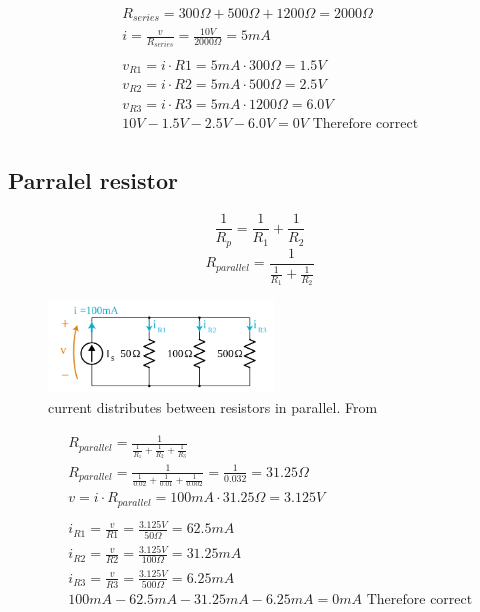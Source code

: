 \begin{align*}
  &\quad R_{series} = 300\Omega + 500\Omega + 1200\Omega = 2000\Omega \\
  &\quad i = \frac{v}{R_{series}} = \frac{10V}{2000\Omega} = 5mA \\
  &\quad \\
  &\quad v_{R1} = i\cdot R1 = 5mA\cdot 300\Omega = 1.5V \\
  &\quad v_{R2} = i\cdot R2 = 5mA\cdot 500\Omega = 2.5V \\
  &\quad v_{R3} = i\cdot R3 = 5mA\cdot 1200\Omega = 6.0V \\
  &\quad 10V -1.5V -2.5V -6.0V = 0V \text{ Therefore correct }\\
\end{align*}


\subsection{Parralel resistor}
\begin{equation} \frac{1}{R_p} = \frac{1}{R_1} + \frac{1}{R_2} \end{equation}
\begin{equation} R_{parallel} = \frac{1}{\frac{1}{R_1} + \frac{1}{R_2}} \end{equation}

\begin{figure}[h]
    \vspace{10mm}
    \centering
    \includegraphics[width=6cm]{image/current-distributes-between-resistors-in-parallel.png}
    \caption{current distributes between resistors in parallel. From \cite{}}
\end{figure}

\begin{align*}
  &\quad R_{parallel} = \frac{1}{\frac{1}{R_1} + \frac{1}{R_2} + \frac{1}{R_3}} \\
  &\quad R_{parallel} = \frac{1}{\frac{1}{0.02} + \frac{1}{0.01} + \frac{1}{0.002}} =
  \frac{1}{0.032} = 31.25\Omega \\
  &\quad v=i\cdot{R_{parallel}} = 100mA\cdot{31.25\Omega} = 3.125V \\
  &\quad \\
  &\quad i_{R1} = \frac{v}{R1} = \frac{3.125V}{50\Omega} = 62.5mA \\
  &\quad i_{R2} = \frac{v}{R2} = \frac{3.125V}{100\Omega} = 31.25mA \\
  &\quad i_{R3} = \frac{v}{R3} = \frac{3.125V}{500\Omega} = 6.25mA \\
  &\quad 100mA -62.5mA -31.25mA -6.25mA = 0mA \text{ Therefore correct }\\
\end{align*}



